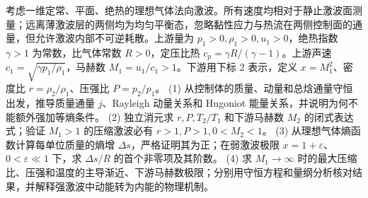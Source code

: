 考虑一维定常、平面、绝热的理想气体法向激波。所有速度均相对于静止激波面测量；远离薄激波层的两侧均为均匀平衡态，忽略黏性应力与热流在两侧控制面的通量，但允许激波内部不可逆耗散。上游量为 \(p_1>0,\rho_1>0,u_1>0\)，绝热指数 \(\gamma>1\) 为常数，比气体常数 \(R>0\)，定压比热 \(c_p=\gamma R/(\gamma-1)\)。上游声速 \(c_1=\sqrt{\gamma p_1/\rho_1}\)，马赫数 \(M_1=u_1/c_1>1\)。下游用下标 \(2\) 表示，定义 \(x=M_1^2\)、密度比 \(r=\rho_2/\rho_1\)、压强比 \(P=p_2/p_1\)。
(1) 从控制体的质量、动量和总焓通量守恒出发，推导质量通量 \(j\)、Rayleigh 动量关系和 Hugoniot 能量关系，并说明为何不能额外强加等熵条件。
(2) 独立消元求 \(r,P,T_2/T_1\) 和下游马赫数 \(M_2\) 的闭式表达式；验证 \(M_1>1\) 的压缩激波必有 \(r>1,P>1,0<M_2<1\)。
(3) 从理想气体熵函数计算每单位质量的熵增 \(\Delta s\)，严格证明其为正；在弱激波极限 \(x=1+\varepsilon\)、\(0<\varepsilon\ll1\) 下，求 \(\Delta s/R\) 的首个非零项及其阶数。
(4) 求 \(M_1\to\infty\) 时的最大压缩比、压强和温度的主导渐近、下游马赫数极限；分别用守恒方程和量纲分析核对结果，并解释强激波中动能转为内能的物理机制。
